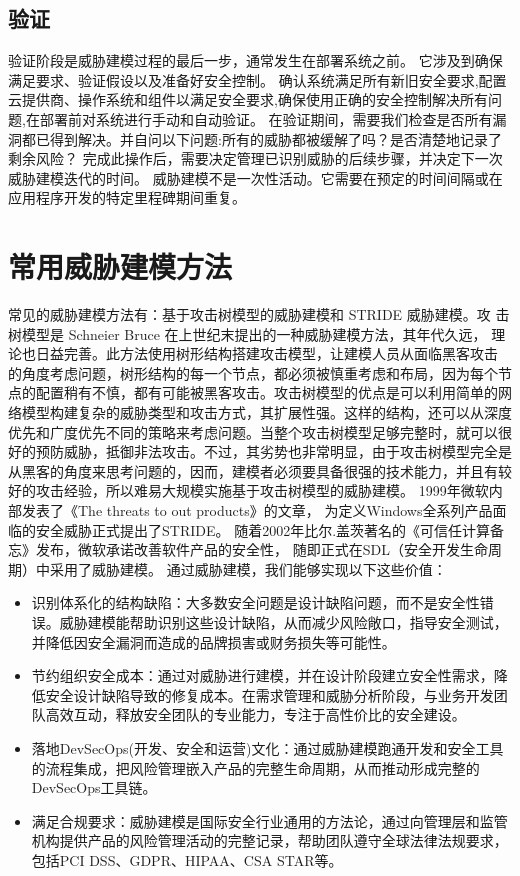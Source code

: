 \subsection{验证}

验证阶段是威胁建模过程的最后一步，通常发生在部署系统之前。 它涉及到确保满足要求、验证假设以及准备好安全控制。
确认系统满足所有新旧安全要求,配置云提供商、操作系统和组件以满足安全要求,确保使用正确的安全控制解决所有问题,在部署前对系统进行手动和自动验证。
在验证期间，需要我们检查是否所有漏洞都已得到解决。并自问以下问题:所有的威胁都被缓解了吗？是否清楚地记录了剩余风险？
完成此操作后，需要决定管理已识别威胁的后续步骤，并决定下一次威胁建模迭代的时间。
威胁建模不是一次性活动。它需要在预定的时间间隔或在应用程序开发的特定里程碑期间重复。

\section{常用威胁建模方法}

常见的威胁建模方法有：基于攻击树模型的威胁建模和 STRIDE 威胁建模。攻
击树模型是 Schneier Bruce 在上世纪末提出的一种威胁建模方法\cite{schneier1999attack}，其年代久远，
理论也日益完善。此方法使用树形结构搭建攻击模型，让建模人员从面临黑客攻击
的角度考虑问题，树形结构的每一个节点，都必须被慎重考虑和布局，因为每个节
点的配置稍有不慎，都有可能被黑客攻击。攻击树模型的优点是可以利用简单的网
络模型构建复杂的威胁类型和攻击方式，其扩展性强。这样的结构，还可以从深度
优先和广度优先不同的策略来考虑问题。当整个攻击树模型足够完整时，就可以很
好的预防威胁，抵御非法攻击。不过，其劣势也非常明显，由于攻击树模型完全是
从黑客的角度来思考问题的，因而，建模者必须要具备很强的技术能力，并且有较
好的攻击经验，所以难易大规模实施基于攻击树模型的威胁建模。
1999年微软内部发表了《The threats to out products》\cite{kohnfelder1999threats}的文章，
为定义Windows全系列产品面临的安全威胁正式提出了STRIDE。
随着2002年比尔.盖茨著名的《可信任计算备忘》发布，微软承诺改善软件产品的安全性，
随即正式在SDL（安全开发生命周期）中采用了威胁建模。
\newline
通过威胁建模，我们能够实现以下这些价值：
\begin{itemize}
    \item 识别体系化的结构缺陷：大多数安全问题是设计缺陷问题，而不是安全性错误。威胁建模能帮助识别这些设计缺陷，从而减少风险敞口，指导安全测试，并降低因安全漏洞而造成的品牌损害或财务损失等可能性。
    \item 节约组织安全成本：通过对威胁进行建模，并在设计阶段建立安全性需求，降低安全设计缺陷导致的修复成本。在需求管理和威胁分析阶段，与业务开发团队高效互动，释放安全团队的专业能力，专注于高性价比的安全建设。
    \item 落地DevSecOps(开发、安全和运营)文化：通过威胁建模跑通开发和安全工具的流程集成，把风险管理嵌入产品的完整生命周期，从而推动形成完整的DevSecOps工具链。
    \item 满足合规要求：威胁建模是国际安全行业通用的方法论，通过向管理层和监管机构提供产品的风险管理活动的完整记录，帮助团队遵守全球法律法规要求，包括PCI DSS、GDPR、HIPAA、CSA STAR等。
  \end{itemize}

